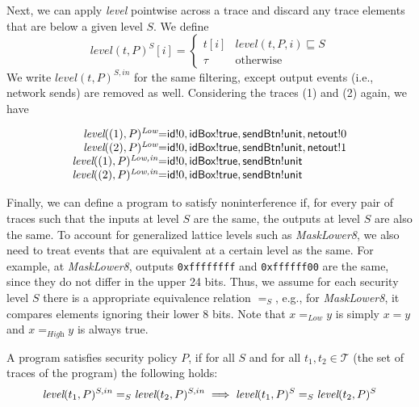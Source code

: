 \documentclass{llncs}
\newcommand{\code}[1]{\textsf{#1}} %
\newcommand{\bcode}[1]{\texttt{#1}}
\newcommand{\tr}{t\xspace}
\newcommand{\tset}{\ensuremath{\mathcal{T}}\xspace}
\newcommand{\tlevel}[3]{\textit{level}(#1, #2, #3)}
\newcommand{\tleveltr}[2]{\textit{level}(#1, #2)}
\begin{document}
Next, we can apply \textit{level} pointwise across a trace and discard
any trace elements that are below a given level $S$. We define
\begin{displaymath}
\tleveltr{\tr}{P}^S[i] =
\begin{cases}
\tr[i] & \tlevel{\tr}{P}{i} \sqsubseteq S \\
\tau & \textrm{otherwise}
\end{cases}
\end{displaymath}
We write $\tleveltr{\tr}{P}^{S,in}$ for the same filtering, except
output events (i.e., network sends) are removed as well.
%
Considering the traces (1) and (2) again, we have

\begin{displaymath}
  \begin{array}{r@{ }c@{ }l}
    \tleveltr{(1)}{P}^\textit{Low} & = & \code{id}!0, \code{idBox}!\code{true},
    \code{sendBtn}!\code{unit}, \code{netout}!0 \\
    \tleveltr{(2)}{P}^\textit{Low} & = & \code{id}!0, \code{idBox}!\code{true},
    \code{sendBtn}!\code{unit}, \code{netout}!1 \\
    \tleveltr{(1)}{P}^\textit{Low,in} & = & \code{id}!0, \code{idBox}!\code{true},
    \code{sendBtn}!\code{unit} \\
    \tleveltr{(2)}{P}^\textit{Low,in} & = & \code{id}!0, \code{idBox}!\code{true},
    \code{sendBtn}!\code{unit} \\
  \end{array}
\end{displaymath}

Finally, we can define a program to satisfy noninterference if, for
every pair of traces such that the inputs at level $S$ are the same,
the outputs at level $S$ are also the same.
%
To account for generalized lattice levels such as \textit{MaskLower8},
we also need to treat events that are equivalent at a certain level as
the same. For example, at \textit{MaskLower8}, outputs
\bcode{0xffffffff} and \bcode{0xffffff00} are the same, since they do
not differ in the upper 24 bits. Thus, we assume for each security
level $S$ there is a appropriate equivalence relation $=_S$, e.g., for
\textit{MaskLower8}, it compares elements ignoring their lower 8
bits. Note that $x =_\textit{Low} y$ is simply $x = y$ and
$x =_\textit{High} y$ is always true.

\begin{definition}
  \label{defn:noninterference}
  A program satisfies security policy $P$, if for all $S$ and for
  all $t_1, t_2 \in
      \tset$ (the set of traces of the program) the following holds:
\begin{displaymath}
    \tleveltr{\tr_1}{P}^{S,in} =_S \tleveltr{\tr_2}{P}^{S,in}
    \implies
    \tleveltr{\tr_1}{P}^S =_S \tleveltr{\tr_2}{P}^S \\
\end{displaymath}
\end{definition}
\end{document}
